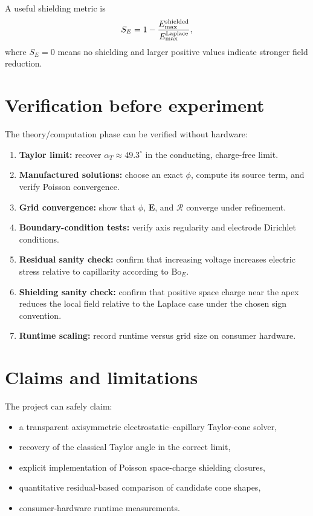\documentclass[11pt]{article}
\newcommand{\vE}{\mathbf{E}}
\newcommand{\BoE}{\mathrm{Bo}_E}
\begin{document}
A useful shielding metric is
\begin{equation}
    S_E=1-\frac{E_{\max}^{\rm shielded}}{E_{\max}^{\rm Laplace}},
\end{equation}
where \(S_E=0\) means no shielding and larger positive values indicate stronger field reduction.

\section{Verification before experiment}

The theory/computation phase can be verified without hardware:
\begin{enumerate}[label=\arabic*.]
    \item \textbf{Taylor limit:} recover \(\alpha_T\approx49.3^\circ\) in the conducting, charge-free limit.
    \item \textbf{Manufactured solutions:} choose an exact \(\phi\), compute its source term, and verify Poisson convergence.
    \item \textbf{Grid convergence:} show that \(\phi\), \(\vE\), and \(\mathcal{R}\) converge under refinement.
    \item \textbf{Boundary-condition tests:} verify axis regularity and electrode Dirichlet conditions.
    \item \textbf{Residual sanity check:} confirm that increasing voltage increases electric stress relative to capillarity according to \(\BoE\).
    \item \textbf{Shielding sanity check:} confirm that positive space charge near the apex reduces the local field relative to the Laplace case under the chosen sign convention.
    \item \textbf{Runtime scaling:} record runtime versus grid size on consumer hardware.
\end{enumerate}

\section{Claims and limitations}

The project can safely claim:
\begin{itemize}
    \item a transparent axisymmetric electrostatic--capillary Taylor-cone solver,
    \item recovery of the classical Taylor angle in the correct limit,
    \item explicit implementation of Poisson space-charge shielding closures,
    \item quantitative residual-based comparison of candidate cone shapes,
    \item consumer-hardware runtime measurements.
\end{itemize}
\end{document}

